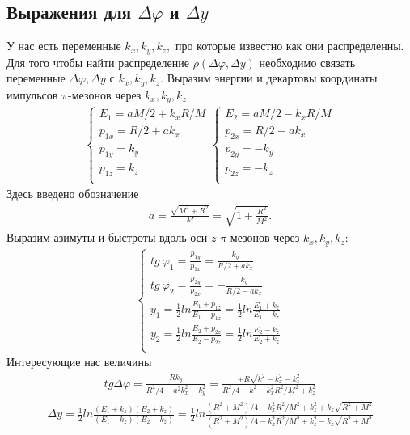 \documentclass[12pt]{article}
\renewcommand{\phi}{\varphi}
\def\Dphi{\Delta\phi}
\def\Dy{\Delta y}
\def\kxx{k_x^2}
\def\kz{k_z}
\def\kzz{k_z^2}
\begin{document}
\subsection{Выражения для $\Dphi$ и $\Dy$}
\qquad
У нас есть переменные $k_x, k_y, k_z,$ про которые известно как они распределенны. Для того чтобы найти распределение $\rho(\Dphi, \Dy)$ необходимо связать переменные $\Dphi, \Dy$ с $k_x, k_y, k_z$. Выразим энергии и декартовы координаты импульсов $\pi$-мезонов через $k_x, k_y, k_z$:
\begin{gather}
	\begin{cases}
		E_1 = a M / 2 + k_x R / M \\
		p_{1x} = R / 2 + a k_x \\
		p_{1y} = k_y \\
		p_{1z} = k_z \\
	\end{cases}
	\begin{cases}
		E_2 = a M / 2 - k_x R / M \\
		p_{2x} = R / 2 - a k_x \\
		p_{2y} = -k_y \\
		p_{2z} = -k_z \\
	\end{cases}
\end{gather}
Здесь введено обозначение
\begin{gather}
	a = \frac{\sqrt{M^2 + R^2}}{M} = \sqrt{1 + \frac{R^2}{M^2}}.  
\end{gather}
Выразим азимуты и быстроты вдоль оси $z$ $\pi$-мезонов через $k_x, k_y, k_z$:
\begin{gather}
	\begin{cases}
		tg\ \phi_1 = \frac{p_{1y}}{p_{1x}} = \frac{k_y}{R / 2 + a k_x} \\
		tg\ \phi_2 = \frac{p_{2y}}{p_{2x}} = -\frac{k_y}{R / 2 - a k_x} \\
		y_1 = \frac{1}{2} ln \frac{E_1 + p_{1z}}{E_1 - p_{1z}} = \frac{1}{2} ln \frac{E_1 + k_z}{E_1 - k_z} \\
		y_2 = \frac{1}{2} ln \frac{E_2 + p_{2z}}{E_2 - p_{2z}} = \frac{1}{2} ln \frac{E_2 - k_z}{E_2 + k_z} \\
	\end{cases}
\end{gather}
Интересующие нас величины
\begin{gather}
\label{tg}
tg \Dphi = \frac{R k_y}{R^2 / 4 - a^2 k_x^2 - k_y^2} = \frac{\pm R\sqrt{k^2 - k_x^2 - k_z^2}}{R^2 / 4 - k^2 - k_x^2 R^2 / M^2 + k_z^2}
\end{gather}
\begin{gather}
\label{dy}
\Dy = \frac{1}{2} ln \frac{(E_1 + \kz)(E_2 + \kz)}{(E_1 - \kz)(E_2 - \kz)} = \frac{1}{2} ln \frac{(R^2 + M^2) / 4 - \kxx R^2 / M^2 + \kzz +\kz \sqrt{R^2 + M^2}}{(R^2 + M^2) / 4 - \kxx R^2 / M^2 + \kzz -\kz \sqrt{R^2 + M^2}}
\end{gather}
\end{document}
